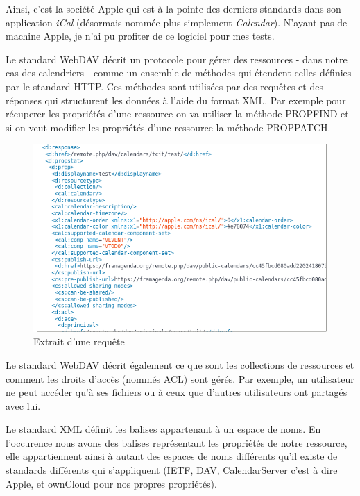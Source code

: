 \documentclass[10pt,a4paper, twoside]{report}
\begin{document}
	Ainsi, c'est la société Apple qui est à la pointe des derniers standards dans son application \textit{iCal} (désormais nommée plus simplement \textit{Calendar}). N'ayant pas de machine Apple, je n'ai pu profiter de ce logiciel pour mes tests.
	
	Le standard WebDAV décrit un protocole pour gérer des ressources - dans notre cas des calendriers - comme un ensemble de méthodes qui étendent celles définies par le standard HTTP. Ces méthodes sont utilisées par des requêtes et des réponses qui structurent les données à l'aide du format XML. Par exemple pour récuperer les propriétés d'une ressource on va utiliser la méthode PROPFIND et si on veut modifier les propriétés d'une ressource la méthode PROPPATCH.
	
	\begin{figure}[ht]
		\centering
		\includegraphics[width=1\textwidth]{images/requete-xml.png}
		\caption*{Extrait d'une requête}
		\label{normal_case}
	\end{figure}
	
	Le standard WebDAV décrit également ce que sont les collections de ressources et comment les droits d'accès (nommés ACL) sont gérés. Par exemple, un utilisateur ne peut accéder qu'à ses fichiers ou à ceux que d'autres utilisateurs ont partagés avec lui.
	
	Le standard XML définit les balises appartenant à un espace de noms. En l'occurence nous avons des balises représentant les propriétés de notre ressource, elle appartiennent ainsi à autant des espaces de noms différents qu'il existe de standards différents qui s'appliquent (IETF, DAV, CalendarServer c'est à dire Apple, et ownCloud pour nos propres propriétés).
	
\end{document}
